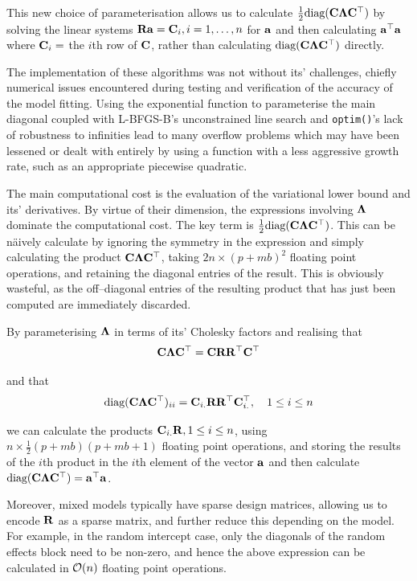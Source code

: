 \noindent This new choice of parameterisation allows us to calculate
$\frac{1}{2} \text{diag}({\bf C} {\boldsymbol \Lambda} {\bf C}^\top)$ by solving the linear systems
${\bf R} {\bf a} = {\bf C}_{i}, i=1, \ldots, n$ for   ${\bf a}$ and then calculating
${\bf a}^\top{\bf a}$ where ${\bf C}_{i} = $ the $i$th row of ${\bf C}$, rather than
calculating $\text{diag}({\bf C} {\boldsymbol \Lambda} {\bf C}^\top)$ directly.
	
The implementation of these algorithms was not without its' challenges, chiefly numerical issues encountered during testing and verification of the accuracy of the model fitting. Using the exponential function to parameterise the main diagonal coupled with L-BFGS-B's unconstrained line search and \texttt{optim()}'s lack of robustness to infinities lead to many overflow problems which may have been lessened or dealt with entirely by using a function with a less aggressive growth rate, such as an appropriate piecewise quadratic.
	
The main computational cost is the evaluation of the variational lower bound and its' derivatives. By
virtue of their dimension, the expressions involving ${\boldsymbol \Lambda}$ dominate the computational cost. The key
term is $\frac{1}{2} \text{diag}({\bf C} {\boldsymbol \Lambda} {\bf C}^\top)$. This can be n\"aively calculate by ignoring the
symmetry in the expression and simply calculating the product ${\bf C} {\boldsymbol \Lambda} {\bf C}^\top$, taking $2 n
\times (p + m b)^2$ floating point operations, and retaining the diagonal entries of the result. This is
obviously wasteful, as the off--diagonal entries of the resulting product that has just been computed
are immediately discarded.
	
By parameterising ${\boldsymbol \Lambda}$ in terms of its' Cholesky factors and realising that
\begin{equation*}
	{\bf C} {\boldsymbol\Lambda} {\bf C}^\top = {\bf C} {\bf R} {\bf R}^\top {\bf C}^\top
\end{equation*}
	
\noindent and that
\begin{equation*}
	\text{diag}({\bf C} {\boldsymbol \Lambda} {\bf C}^\top)_{ii} = {\bf C}_{i .} {\bf R} {\bf R}^\top {\bf C}_{i .}^\top,\quad1 \leq i \leq n
\end{equation*}
	
\noindent we can calculate the products ${\bf C}_{i .} {\bf R}, 1 \leq i \leq n$, using $n \times \frac{1}{2}(p + m
b)(p + m b   + 1)$ floating point operations, and storing the results of the $i$th product in the $i$th
element of the   vector ${\bf a}$ and then calculate $\text{diag}({\bf C} {\boldsymbol \Lambda} {\bf C}^\top) = {\bf a}^\top {\bf a}$.
	
Moreover, mixed models typically have sparse design matrices, allowing us to encode ${\bf R}$ as a sparse matrix, and	further reduce   this depending on the model. For example, in the random intercept case, only the diagonals of the random effects block need to be non-zero, and hence the above expression can be calculated in
$\mathcal{O}(n)$ floating point operations.
	
